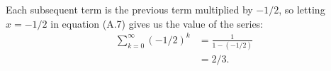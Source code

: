 \exercise
Each subsequent term is the previous term multiplied by $-1/2$, so letting $x=-1/2$ in equation (A.7) gives us the value of the series:
\begin{align*}
    \sum_{k=0}^\infty(-1/2)^k &= \frac{1}{1-(-1/2)} \\
    &= 2/3.
\end{align*}
